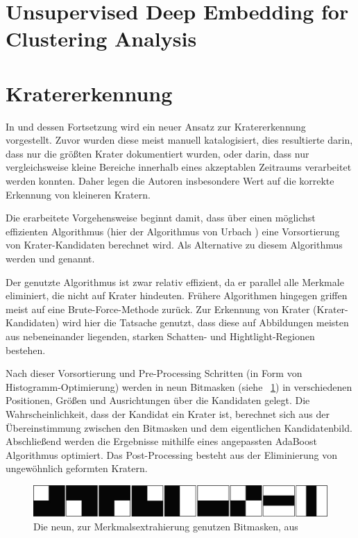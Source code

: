 \section{Unsupervised Deep Embedding for Clustering Analysis}
\label{sec:unsupervised_dec}
\cite{junyuan_16}

\section{Kratererkennung}
\label{sec:craterdetection}

In \cite{bandeira_10} und dessen Fortsetzung \cite{bandeira_12} wird ein neuer Ansatz zur Kratererkennung vorgestellt. Zuvor wurden diese meist manuell katalogisiert, dies resultierte darin, dass nur die größten Krater dokumentiert wurden, oder darin, dass nur vergleichsweise kleine Bereiche innerhalb eines akzeptablen Zeitraums verarbeitet werden konnten. Daher legen die Autoren insbesondere Wert auf die korrekte Erkennung von kleineren Kratern.

Die erarbeitete Vorgehensweise beginnt damit, dass über einen möglichst effizienten Algorithmus (hier der Algorithmus von Urbach \etal \cite{urbach_stepinski_2009}) eine Vorsortierung von Krater-Kandidaten berechnet wird. Als Alternative zu diesem Algorithmus werden \cite{bandeira_07} und \cite{salamuniccar_10} genannt.

Der genutzte Algorithmus ist zwar relativ effizient, da er parallel alle Merkmale eliminiert, die nicht auf Krater hindeuten. Frühere Algorithmen hingegen griffen meist auf eine Brute-Force-Methode zurück. Zur Erkennung von Krater (\bzw Krater-Kandidaten) wird hier die Tatsache genutzt, dass diese auf Abbildungen meisten aus nebeneinander liegenden, starken Schatten- und Hightlight-Regionen bestehen.

Nach dieser Vorsortierung und Pre-Processing Schritten (in Form von Histogramm-Optimierung) werden in \cite{bandeira_10, bandeira_12} neun Bitmasken (siehe \figurename~\ref{fig:BDS12_01}) in verschiedenen Positionen, Größen und Ausrichtungen über die Kandidaten gelegt. Die Wahrscheinlichkeit, dass der Kandidat ein Krater ist, berechnet sich aus der Übereinstimmung zwischen den Bitmasken und dem eigentlichen Kandidatenbild. Abschließend werden die Ergebnisse mithilfe eines angepassten AdaBoost Algorithmus optimiert. Das Post-Processing besteht aus der Eliminierung von ungewöhnlich geformten Kratern.

\begin{figure}[h!]
	\centering
	\includegraphics[width=.8\textwidth,keepaspectratio]{images/BDS12_01.png}
	\caption{Die neun, zur Merkmalsextrahierung genutzen Bitmasken, aus \cite{bandeira_12}}
	\label{fig:BDS12_01}
\end{figure}

